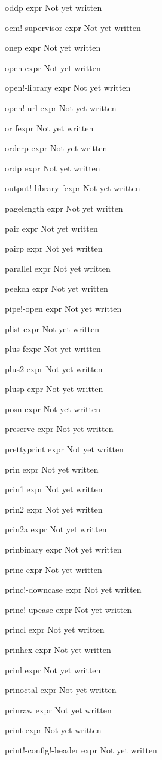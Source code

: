 \documentclass[a4paper,11pt]{article}
\begin{document}
\begin{description}
oddp expr
Not yet written

oem!-supervisor expr
Not yet written

onep expr
Not yet written

open expr
Not yet written

open!-library expr
Not yet written

open!-url expr
Not yet written

or fexpr
Not yet written

orderp expr
Not yet written

ordp expr
Not yet written

output!-library fexpr
Not yet written

pagelength expr
Not yet written

pair expr
Not yet written

pairp expr
Not yet written

parallel expr
Not yet written

peekch expr
Not yet written

pipe!-open expr
Not yet written

plist expr
Not yet written

plus fexpr
Not yet written

plus2 expr
Not yet written

plusp expr
Not yet written

posn expr
Not yet written

preserve expr
Not yet written

prettyprint expr
Not yet written

prin expr
Not yet written

prin1 expr
Not yet written

prin2 expr
Not yet written

prin2a expr
Not yet written

prinbinary expr
Not yet written

princ expr
Not yet written

princ!-downcase expr
Not yet written

princ!-upcase expr
Not yet written

princl expr
Not yet written

prinhex expr
Not yet written

prinl expr
Not yet written

prinoctal expr
Not yet written

prinraw expr
Not yet written

print expr
Not yet written

print!-config!-header expr
Not yet written


\end{description}
\end{document}
